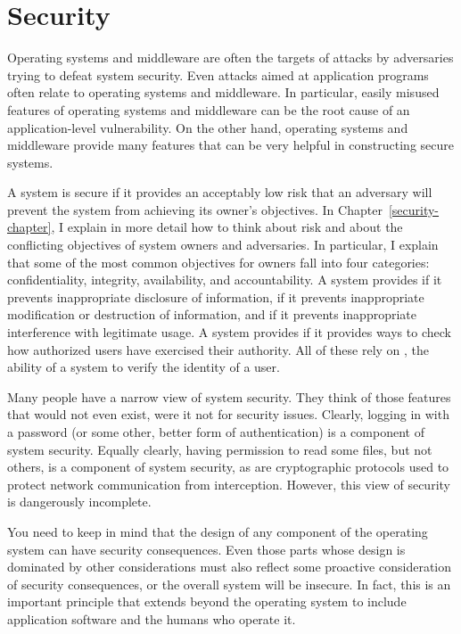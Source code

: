 \section{Security}\label{intro-security-section}

Operating systems and middleware are often the targets of attacks by
adversaries trying to defeat system security.  Even attacks aimed at
application programs often relate to operating systems and middleware.
In particular, easily misused features of operating systems and
middleware can be the root cause of an application-level
vulnerability.  On the other hand, operating systems and middleware
provide many features that can be very helpful in constructing secure
systems.

A system is secure if it provides an acceptably low risk that an
adversary will prevent the system from achieving its owner's
objectives.  In Chapter~\ref{security-chapter}, I explain in more
detail how to think about risk and about the conflicting objectives
of system owners and adversaries.  In particular, I explain that some
of the most common objectives for owners fall into four categories:
confidentiality, integrity, availability, and accountability.  A
system provides  if it prevents inappropriate
disclosure of information,  if it prevents
inappropriate modification or destruction of information, and
 if it prevents inappropriate interference with
legitimate usage.  A system provides  if it
provides ways to check how authorized users have exercised their
authority.  All of these rely on , the ability
of a system to verify the identity of a user.

Many people have a narrow view of system security.  They think of
those features that would not even exist, were it not for security
issues.  Clearly, logging in with a password (or some other, better
form of authentication) is a component of system security.  Equally
clearly, having permission to read some files, but not others, is a
component of system security, as are cryptographic protocols used to
protect network communication from interception.  However, this view
of security is dangerously incomplete.

You need to keep in mind that the design of any component of the
operating system can have security consequences.  Even those parts
whose design is dominated by other considerations must also reflect
some proactive consideration of security consequences, or the overall
system will be insecure.  In fact, this is an important principle
that extends beyond the operating system to include application
software and the humans who operate it.

